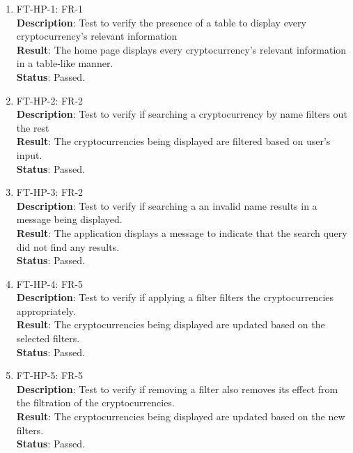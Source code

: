 \documentclass[12pt, titlepage]{article}
\begin{document}
\begin{enumerate}
    \item FT-HP-1: FR-1\\
    \textbf{Description}: Test to verify the presence of a table to display every cryptocurrency’s relevant information\\
    \textbf{Result}: The home page displays every cryptocurrency’s relevant information in a table-like manner.\\
    \textbf{Status}: Passed.\\
    
    \item FT-HP-2: FR-2\\
    \textbf{Description}: Test to verify if searching a cryptocurrency by name filters out the rest\\
    \textbf{Result}: The cryptocurrencies being displayed are filtered based on user’s input.\\
    \textbf{Status}: Passed.\\
    
    \item FT-HP-3: FR-2\\
    \textbf{Description}: Test to verify if searching a an invalid name results in a message being displayed.\\
    \textbf{Result}: The application displays a message to indicate that the search query did not find any results.\\
    \textbf{Status}: Passed.\\
    
    \item FT-HP-4: FR-5\\
    \textbf{Description}: Test to verify if applying a filter filters the cryptocurrencies appropriately.\\
    \textbf{Result}: The cryptocurrencies being displayed are updated based on the selected filters.\\
    \textbf{Status}: Passed.\\
    
    \item FT-HP-5: FR-5\\
    \textbf{Description}: Test to verify if removing a filter also removes its effect from the filtration of the cryptocurrencies.\\
    \textbf{Result}: The cryptocurrencies being displayed are updated based on the new filters.\\
    \textbf{Status}: Passed.\\
    

\end{enumerate}
\end{document}
